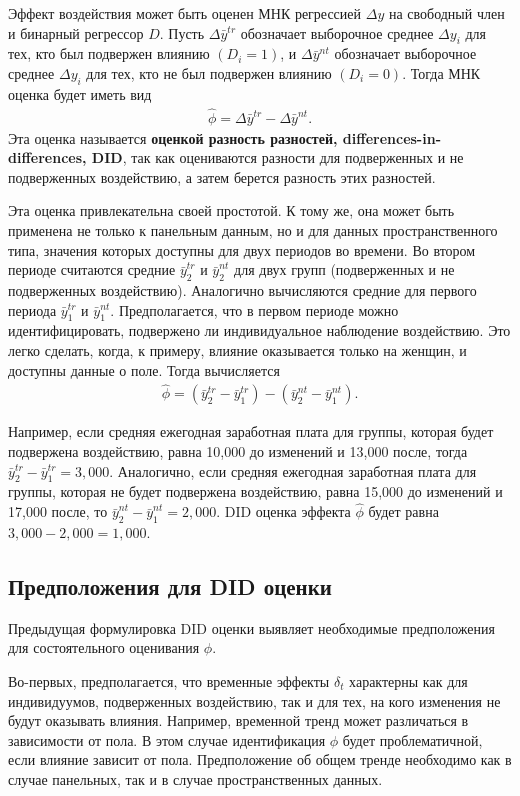 Эффект воздействия может быть оценен МНК регрессией $\Delta y$ на свободный член и бинарный регрессор $D$. Пусть $\Delta\bar{y}^{tr}$ обозначает выборочное среднее $\Delta y_i$ для тех, кто был подвержен влиянию $(D_i=1)$, и  $\Delta \bar{y}^{nt}$ обозначает выборочное среднее $\Delta y_i$ для тех, кто не был подвержен влиянию $(D_i=0)$. Тогда МНК оценка будет иметь вид
 \begin{align}
\hat{\phi}=\Delta \bar{y}^{tr} - \Delta \bar{y}^{nt}.
\label{Eq:22.43}
\end{align}
Эта оценка называется \textbf{оценкой разность разностей, differences-in-differences, DID}, так как оцениваются разности для подверженных и не подверженных воздействию, а затем берется разность этих разностей.

Эта оценка привлекательна своей простотой. К тому же, она может быть применена не только к панельным данным, но и для данных пространственного типа, значения которых доступны для двух периодов во времени. Во втором периоде считаются средние $\bar{y}^{tr}_2$ и $\bar{y}^{nt}_2$ для двух групп (подверженных и не подверженных воздействию). Аналогично вычисляются средние для первого периода $\bar{y}^{tr}_1$ и $\bar{y}^{nt}_1$. Предполагается, что в первом периоде можно идентифицировать, подвержено ли индивидуальное наблюдение воздействию.  Это легко сделать, когда, к примеру, влияние оказывается только на женщин, и доступны данные о поле. Тогда вычисляется
 \begin{align}
\hat{\phi}=(\bar{y}^{tr}_2- \bar{y}^{tr}_1) - ( \bar{y}^{nt}_2 - \bar{y}^{nt}_1).
\label{Eq:22.44}
\end{align}

Например, если средняя ежегодная заработная плата для группы, которая будет подвержена воздействию, равна 10,000 до изменений и 13,000 после, тогда $\bar{y}^{tr}_2- \bar{y}^{tr}_1=3,000$. Аналогично, если средняя ежегодная заработная плата для группы, которая не будет подвержена воздействию, равна 15,000 до изменений и 17,000 после, то  $\bar{y}^{nt}_2 - \bar{y}^{nt}_1=2,000$. DID оценка эффекта $\hat{\phi}$ будет равна $3,000-2,000=1,000$.

\subsection{Предположения для DID оценки}

Предыдущая формулировка DID оценки выявляет необходимые предположения для состоятельного оценивания $\phi$.

Во-первых, предполагается, что временные эффекты $\delta_t$ характерны как для индивидуумов, подверженных воздействию, так и для тех, на кого изменения не будут оказывать влияния. Например, временной тренд может различаться в зависимости от пола. В этом случае идентификация $\phi$  будет проблематичной, если влияние зависит от пола. Предположение об общем тренде необходимо как в случае панельных, так и в случае пространственных данных.

